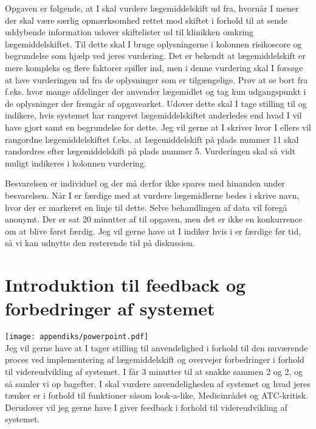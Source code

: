 Opgaven er følgende, at I skal vurdere lægemiddelskift ud fra, hvornår I mener der skal være særlig opmærksomhed rettet mod skiftet i forhold til at sende uddybende information udover skiftelister ud til klinikken omkring lægemiddelskiftet. Til dette skal I bruge oplysningerne i kolonnen risikoscore og begrundelse som hjælp ved jeres vurdering. Det er bekendt at lægemiddelskift er mere kompleks og flere faktorer spiller ind, men i denne vurdering skal I forsøge at lave vurderingen ud fra de oplysninger som er tilgængelige. Prøv at se bort fra f.eks. hvor mange afdelinger der anvender lægemidlet og tag kun udgangspunkt i de oplysninger der fremgår af opgavearket. Udover dette skal I tage stilling til og indikere, hvis systemet har rangeret lægemiddelskiftet anderledes end hvad I vil have gjort samt en begrundelse for dette. Jeg vil gerne at I skriver hvor I ellers vil rangordne lægemiddelskiftet f.eks. at lægemiddelskift på plads nummer 11 skal randordres efter lægemiddelskift på plads nummer 5. Vurderingen skal så vidt muligt indikeres i kolonnen vurdering.

Besvarelsen er individuel og der må derfor ikke spares med hinanden under besvarelsen. Når I er færdige med at vurdere lægemidlerne bedes i skrive navn, hvor der er markeret en linje til dette. Selve behandlingen af data vil foregå anonymt. Der er sat 20 minutter af til opgaven, men det er ikke en konkurrence om at blive først færdig. Jeg vil gerne have at I indiker hvis i er færdige før tid, så vi kan udnytte den resterende tid på diskussion.

\section{Introduktion til feedback og forbedringer af systemet}
\texttt{[image: appendiks/powerpoint.pdf]} \\ 

Jeg vil gerne have at I tager stilling til anvendelighed i forhold til den nuværende proces ved implementering af lægemiddelskift og overvejer forbedringer i forhold til videreudvikling af systemet. I får 3 minutter til at snakke sammen 2 og 2, og så samler vi op bagefter. I skal  vurdere anvendeligheden af systemet og hvad jeres tænker er i forhold til funktioner såsom  look-a-like, Medicinrådet og ATC-kritisk. Derudover vil jeg gerne have I giver feedback i forhold til videreudvikling af systemet.

